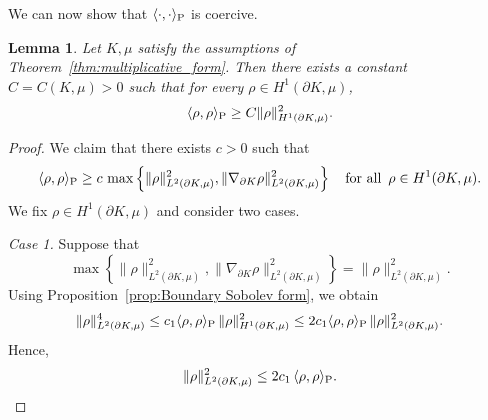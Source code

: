 \documentclass[a4paper, 11pt]{article}
\newtheorem{lemma}[theorem]{Lemma}
\theoremstyle{definition}
\begin{document}
We can now show that $\langle \cdot, \cdot\rangle_{\rm P}$ is coercive.
\begin{lemma}\label{lem:poincare_coercivity}
Let $K,\mu$ satisfy the assumptions of Theorem~\ref{thm:multiplicative_form}. Then there exists a constant $C=C(K,\mu)>0$ such that for every $\rho\in H^{1}(\partial K,\mu)$,
\begin{equation}\label{eq:control_of_H1_norm}
    \langle \rho,\rho \rangle_{\rm P}\geq C \|\rho\|^2_{H^{1}(\partial K,\mu)}.
\end{equation}
\end{lemma}
\begin{proof}
We claim that there exists $c>0$ such that
\[\langle \rho,\rho \rangle_{\rm P}\geq c\,\max\left\{\|\rho\|^2_{L^2(\partial K, \mu)},\|\nabla_{\partial K}\rho\|^2_{L^2(\partial K, \mu)}\right\}\quad\text{for all} \,\,\,\rho\in H^{1}(\partial K,\mu).\]
We fix $\rho\in H^{1}(\partial K,\mu)$ and consider two cases.
\smallskip

\noindent
\emph{Case 1.}
Suppose that
\[\max\left\{\|\rho\|^2_{L^2(\partial K, \mu)},\|\nabla_{\partial K}\rho\|^2_{L^2(\partial K, \mu)}\right\}=\|\rho\|^2_{L^2(\partial K, \mu)}.
\]
Using Proposition~\ref{prop:Boundary Sobolev form}, we obtain
\[\|\rho\|^4_{L^2(\partial K, \mu)}\leq c_1 \langle \rho,\rho \rangle_{\rm P}\,\|\rho\|^2_{H^{1}(\partial K,\mu)}\leq 2c_1 \langle \rho,\rho \rangle_{\rm P}\,\|\rho\|^2_{L^2(\partial K, \mu)}.\]
Hence,
\begin{equation}\label{eq:coercivity_case_1}
\|\rho\|^2_{L^2(\partial K, \mu)}
\leq 
2c_1\,\langle \rho,\rho \rangle_{\rm P}.
\end{equation}


\end{proof}
\end{document}
